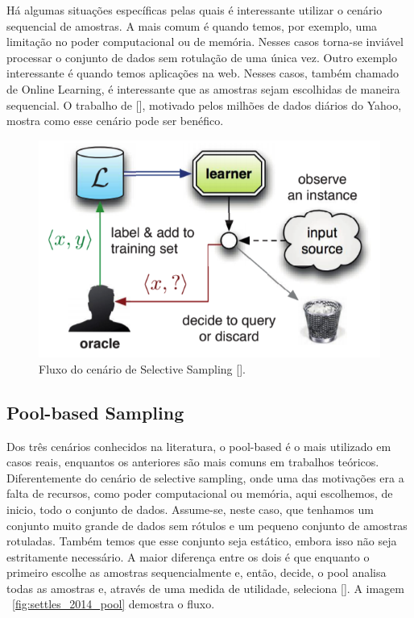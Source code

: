 Há algumas situações específicas pelas quais é interessante utilizar o cenário sequencial de amostras. A mais comum é quando temos, por exemplo, uma limitação no poder computacional ou de memória. Nesses casos torna-se inviável processar o conjunto de dados sem rotulação de uma única vez. Outro exemplo interessante é quando temos aplicações na web. Nesses casos, também chamado de Online Learning, é interessante que as amostras sejam escolhidas de maneira sequencial. O trabalho de [\cite{chu2011unbiased}], motivado pelos milhões de dados diários do Yahoo, mostra como esse cenário pode ser benéfico. 


\begin{figure}
  \centering
  \includegraphics[width=.5\textwidth]{figures/settles_2014_selective_sampling.png}
  \caption{Fluxo do cenário de Selective Sampling [\cite{settles2014active}].}
  \label{fig:settles_2014_selective_sampling}
\end{figure}

\subsection{Pool-based Sampling}
\label{sec:cenarios_pool}

Dos três cenários conhecidos na literatura, o pool-based é o mais utilizado em casos reais, enquantos os anteriores são mais comuns em trabalhos teóricos. Diferentemente do cenário de selective sampling, onde uma das motivações era a falta de recursos, como poder computacional ou memória, aqui escolhemos, de inicio, todo o conjunto de dados. Assume-se, neste caso, que tenhamos um conjunto muito grande de dados sem rótulos e um pequeno conjunto de amostras rotuladas. Também temos que esse conjunto seja estático, embora isso não seja estritamente necessário. A maior diferença entre os dois é que enquanto o primeiro escolhe as amostras sequencialmente e, então, decide, o pool analisa todas as amostras e, através de uma medida de utilidade, seleciona [\cite{settles2014active}]. A imagem ~\ref{fig:settles_2014_pool}  demostra o fluxo.

